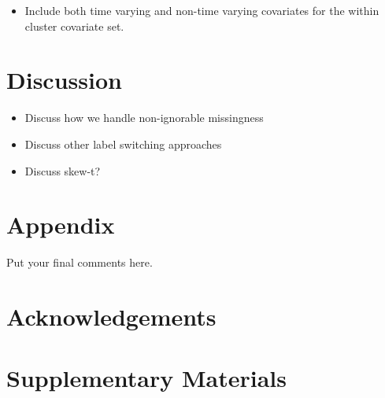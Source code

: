 \documentclass[useAMS,referee]{biom}
\begin{document}
\begin{itemize}

\item Include both time varying and non-time varying covariates for the within cluster covariate set. 

\end{itemize}

\newpage

\section{Discussion}
\label{s:discuss}


\begin{itemize}

\item Discuss how we handle non-ignorable missingness 

\item Discuss other label switching approaches

\item Discuss skew-t?

\end{itemize}


\section{Appendix}

Put your final comments here. 


\backmatter


\section*{Acknowledgements}


\section*{Supplementary Materials}
\end{document}
